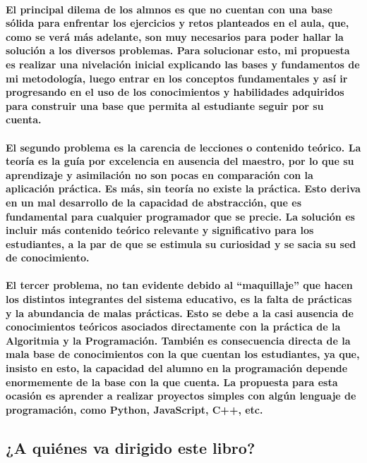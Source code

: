 \documentclass[a4paper, 12pt]{article}
\begin{document}
    \paragraph{
        El principal dilema de los almnos es que no cuentan con una base sólida para enfrentar los ejercicios y retos planteados en el aula, 
        que, como se verá más adelante, son muy necesarios para poder hallar la solución a los diversos problemas. Para solucionar esto, 
        mi propuesta es realizar una nivelación inicial explicando las bases y fundamentos de mi metodología, luego entrar en los conceptos 
        fundamentales y así ir progresando en el uso de los conocimientos y habilidades adquiridos para construir una base que permita al 
        estudiante seguir por su cuenta.
    }
    \paragraph{
        El segundo problema es la carencia de lecciones o contenido teórico. La teoría es la guía por excelencia en ausencia del maestro, 
        por lo que su aprendizaje y asimilación no son pocas en comparación con la aplicación práctica. Es más, sin teoría no existe la 
        práctica. Esto deriva en un mal desarrollo de la capacidad de abstracción, que es fundamental para cualquier programador que se 
        precie. La solución es incluir más contenido teórico relevante y significativo para los estudiantes, a la par de que se estimula 
        su curiosidad y se sacia su sed de conocimiento.
    }
    \paragraph{
        El tercer problema, no tan evidente debido al ``maquillaje'' que hacen los distintos integrantes del sistema educativo, es la falta 
        de prácticas y la abundancia de malas prácticas. Esto se debe a la casi ausencia de conocimientos teóricos asociados directamente 
        con la práctica de la Algoritmia y la Programación. También es consecuencia directa de la mala base de conocimientos con la que 
        cuentan los estudiantes, ya que, insisto en esto, la capacidad del alumno en la programación depende enormemente de la base con la 
        que cuenta. La propuesta para esta ocasión es aprender a realizar proyectos simples con algún lenguaje de programación, como 
        Python, JavaScript, C++, etc.
    }
    \subsection*{\textbf{¿A quiénes va dirigido este libro?}}
\end{document}
